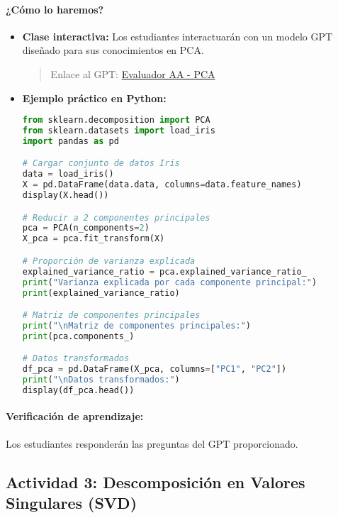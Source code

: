 \documentclass[a4,11pt]{aleph-notas}
\begin{document}
\paragraph{¿Cómo lo haremos?}  
\begin{itemize}[leftmargin=*]
    \item \textbf{Clase interactiva:}  Los estudiantes interactuarán con un modelo GPT diseñado para sus conocimientos en PCA.
    \begin{quote}
        Enlace al GPT: \href{https://chatgpt.com/g/g-674f7cde85ac81918e2a05a692ae0ee9-evluador-aa-pca}{Evaluador AA - PCA}
    \end{quote}


    \item \textbf{Ejemplo práctico en Python:}  
\begin{pycodigo}
\begin{lstlisting}[language=Python]
from sklearn.decomposition import PCA
from sklearn.datasets import load_iris
import pandas as pd

# Cargar conjunto de datos Iris
data = load_iris()
X = pd.DataFrame(data.data, columns=data.feature_names)
display(X.head())

# Reducir a 2 componentes principales
pca = PCA(n_components=2)
X_pca = pca.fit_transform(X)

# Proporción de varianza explicada
explained_variance_ratio = pca.explained_variance_ratio_
print("Varianza explicada por cada componente principal:")
print(explained_variance_ratio)

# Matriz de componentes principales
print("\nMatriz de componentes principales:")
print(pca.components_)

# Datos transformados
df_pca = pd.DataFrame(X_pca, columns=["PC1", "PC2"])
print("\nDatos transformados:")
display(df_pca.head())
\end{lstlisting}
\end{pycodigo}

\end{itemize}

\paragraph{Verificación de aprendizaje:}  
Los estudiantes responderán las preguntas del GPT proporcionado.

\subsection*{Actividad 3: Descomposición en Valores Singulares (SVD)}
\end{document}
